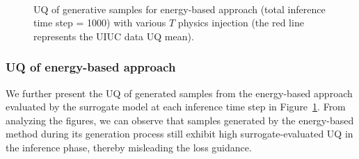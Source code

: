 \begin{figure}[!htbp]
    \centering
    \\[1em]
    \caption{UQ of generative samples for energy-based approach (total inference time step = 1000) with various $T$ physics injection (the red line represents the UIUC data UQ mean).}
    \label{ch7:fig:uqEnergy}
\end{figure}


\subsubsection{UQ of energy-based approach}
\label{ch7:sect:AppendixUncertainty}

We further present the UQ of generated samples from the energy-based approach evaluated by the surrogate model at each inference time step in Figure~\ref{ch7:fig:uqEnergy}. From analyzing the figures, we can observe that samples generated by the energy-based method during its generation process still exhibit high surrogate-evaluated UQ in the inference phase, thereby misleading the loss guidance.